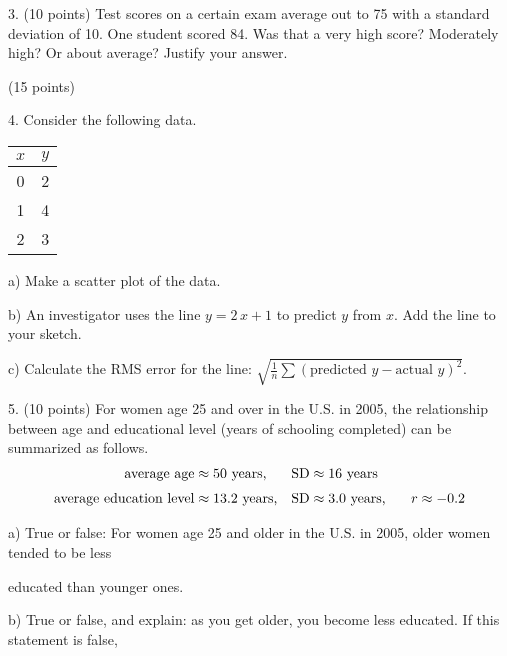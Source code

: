 \documentclass[10pt]{article}
\begin{document}
3. (10 points) Test scores on a certain exam average out to 75 with a standard 
deviation of 10.  One student scored 84.   Was that a very high score?  Moderately high?  
Or about average?  Justify your answer.
\vfill
\eject

 (15 points)\vspace{-15pt}

4. Consider the following data.
\begin{tabular}{|c|c|}\hline
$x$ & $y$\\\hline
0   & 2\\
1   & 4\\
2   & 3\\\hline
\end{tabular}

\hspace{10pt} a) Make a scatter plot of the data.  
\vspace{1.5in}

\hspace{10pt} b) An investigator uses the line $y=2\,x + 1$ to predict $y$ from $x$.
Add the line to your sketch.
\medskip

\hspace{10pt} c) Calculate the RMS error for the line:
$\displaystyle\sqrt{\frac{1}{n}\sum\left(\mbox{predicted $y$} - \mbox{actual $y$}\right)^2}$.
\vspace{2.8in}


5. (10 points) For women age 25 and over in the U.S. in 2005, the relationship between
age and educational level (years of schooling completed) can be summarized as
follows. 
\begin{align*}
\mbox{average age}         & \approx \mbox{50 years,}    & \mbox{SD} & \approx \mbox{16 years}\\[3pt]
\mbox{average education level}  & \approx \mbox{13.2 years,}  & \mbox{SD} & \approx \mbox{3.0 years,
   \hspace{15pt}} r\approx -0.2
\end{align*}

\hspace{20pt} a) True or false:  For women age 25 and older in the U.S. in 2005, older women tended 
to be less\vspace{-5pt}

\hspace{20pt} \hphantom{a) }  educated than younger ones.
\vspace{.5in}

\hspace{20pt} b) True or false, and explain:  as you get older, you become less educated.  
If this statement is false,\vspace{-4pt}
\end{document}
